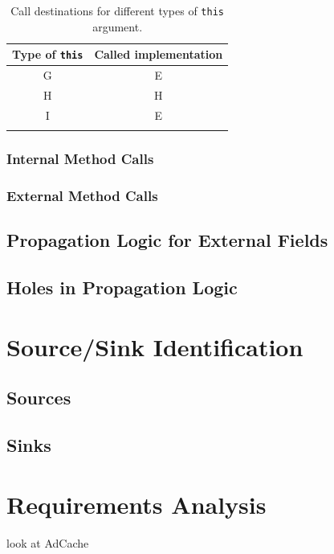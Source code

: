 \documentclass[12pt,twoside,notitlepage]{report}
\begin{document}
\begin{table}
	\begin{center}
	\begin{tabular}{|c|c|}
		\firsthline
		\textbf{Type of} \verb$this$ & \textbf{Called implementation} \\
		\hline
		G & E \\
		H & H \\
		I & E \\
		\lasthline
	\end{tabular}
	\end{center}
	\caption{Call destinations for different types of \texttt{this} argument.}
	\label{table:TaintPropagation_DestDecision_ClassHierarchy_Destinations}
\end{table}

\subsubsection{Internal Method Calls}

\subsubsection{External Method Calls}

\subsection{Propagation Logic for External Fields}

\subsection{Holes in Propagation Logic}

\section{Source/Sink Identification}

\subsection{Sources}

\subsection{Sinks}

\section{Requirements Analysis}
look at AdCache
\end{document}
